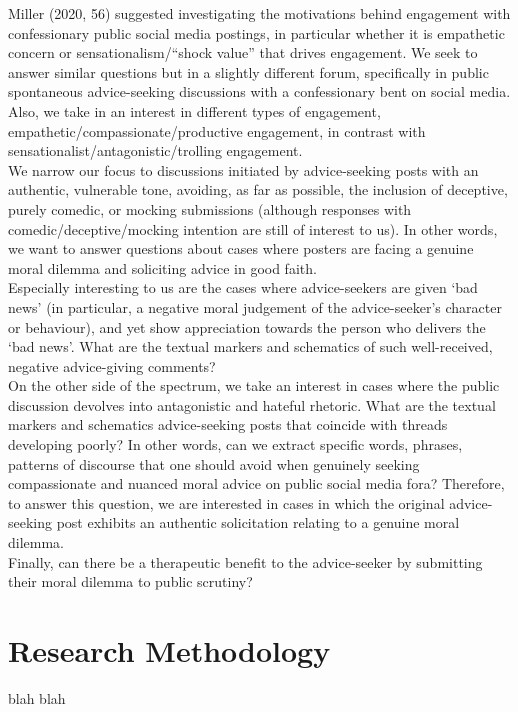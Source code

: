 \documentclass[sigconf, nonacm]{acmart}
\begin{document}
Miller (2020, 56) suggested investigating the motivations behind engagement with confessionary public social media postings, in particular whether it is empathetic concern or sensationalism/“shock value” that drives engagement. We seek to answer similar questions but in a slightly different forum, specifically in public spontaneous advice-seeking discussions with a confessionary bent on social media. Also, we take in an interest in different types of engagement, empathetic/compassionate/productive engagement, in contrast with sensationalist/antagonistic/trolling engagement.\\
We narrow our focus to discussions initiated by advice-seeking posts with an authentic, vulnerable tone, avoiding, as far as possible, the inclusion of deceptive, purely comedic, or mocking submissions (although responses with comedic/deceptive/mocking intention are still of interest to us). In other words, we want to answer questions about cases where posters are facing a genuine moral dilemma and soliciting advice in good faith.\\
Especially interesting to us are the cases where advice-seekers are given ‘bad news’ (in particular, a negative moral judgement of the advice-seeker’s character or behaviour), and yet show appreciation towards the person who delivers the ‘bad news’. What are the textual markers and schematics of such well-received, negative advice-giving comments?\\
On the other side of the spectrum, we take an interest in cases where the public discussion devolves into antagonistic and hateful rhetoric. What are the textual markers and schematics advice-seeking posts that coincide with threads developing poorly? In other words, can we extract specific words, phrases, patterns of discourse that one should avoid when genuinely seeking compassionate and nuanced moral advice on public social media fora? Therefore, to answer this question, we are interested in cases in which the original advice-seeking post exhibits an authentic solicitation relating to a genuine moral dilemma.\\
Finally, can there be a therapeutic benefit to the advice-seeker by submitting their moral dilemma to public scrutiny?


\section{Research Methodology}

blah blah






\end{document}
